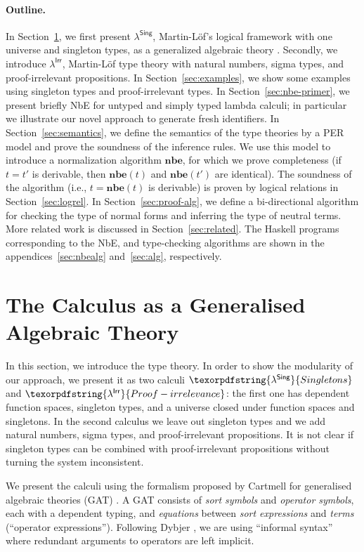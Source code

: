 \documentclass{LMCS}
\theoremstyle{plain}\newtheorem{satz}[thm]{Satz}
\newcommand{\LONGVERSION}[1]{#1}
\newcommand{\lambdaSing}{\texorpdfstring{\ensuremath{\lambda^{\mathsf{Sing}}}}{Singletons}}
\newcommand{\lambdaPI}{\texorpdfstring{\ensuremath{\lambda^{\mathsf{Irr}}}}{Proof-irrelevance}}
\newcommand{\nbe}[1]{\mathbf{nbe}(#1)}
\newcommand{\LONGVERSION}[1]{}
\begin{document}
\paragraph{Outline.} 
In Section~\ref{sec:cwf-gat}, we first present \lambdaSing,
Martin-L\"of's logical framework with one universe and singleton
types, as a generalized algebraic theory \cite{cartmell}.  Secondly,
we introduce \lambdaPI, Martin-L\"of type theory with natural numbers,
sigma types, and proof-irrelevant propositions.  In
Section~\ref{sec:examples}, we show some examples using singleton types and
proof-irrelevant types.  In Section~\ref{sec:nbe-primer}, we present
briefly NbE for untyped and simply typed lambda calculi; in particular
we illustrate our novel approach to generate fresh identifiers.  In
Section~\ref{sec:semantics}, we define the semantics of the type
theories by a PER model and prove the soundness of the inference rules.
We use this model to introduce a normalization algorithm
$\textbf{nbe}$, for which we prove completeness (if $t = t'$ is derivable,
then $\nbe{t}$ and $\nbe{t'}$ are identical). 
The soundness of the algorithm (i.e., $t = \nbe{t}$ is derivable)
is proven by logical relations in Section~\ref{sec:logrel}.
In Section~\ref{sec:proof-alg}, we define a bi-directional algorithm for
checking the type of normal forms and inferring the type of neutral
terms.  More related work is discussed in Section~\ref{sec:related}.
\LONGVERSION{ The Haskell programs corresponding to the NbE, and
  type-checking algorithms are shown in the
  appendices~\ref{sec:nbealg} and~\ref{sec:alg}, respectively.  }

 \section{The Calculus as a Generalised Algebraic Theory}
\label{sec:cwf-gat}
 
\noindent In this section, we introduce the type theory.  In order to show the
modularity of our approach, we present it as two calculi $\lambdaSing$
and $\lambdaPI$: the first one has dependent function spaces,
singleton types, and a universe closed under function spaces and
singletons. In the second calculus we leave out singleton types and we
add natural numbers, sigma types, and proof-irrelevant propositions.
It is not clear if singleton types can be combined with
proof-irrelevant propositions without turning the system inconsistent.


We present the calculi using the formalism proposed by Cartmell for
generalised algebraic theories (GAT) \cite{cartmell}.  A GAT consists
of \emph{sort symbols} and \emph{operator symbols}, each with
a dependent typing, and \emph{equations} between \emph{sort
  expressions} and \emph{terms} (``operator expressions'').
Following Dybjer \cite{dybjer:internalTypeTheory}, we are using
``informal syntax'' where redundant arguments to operators are left
implicit. 
\end{document}
